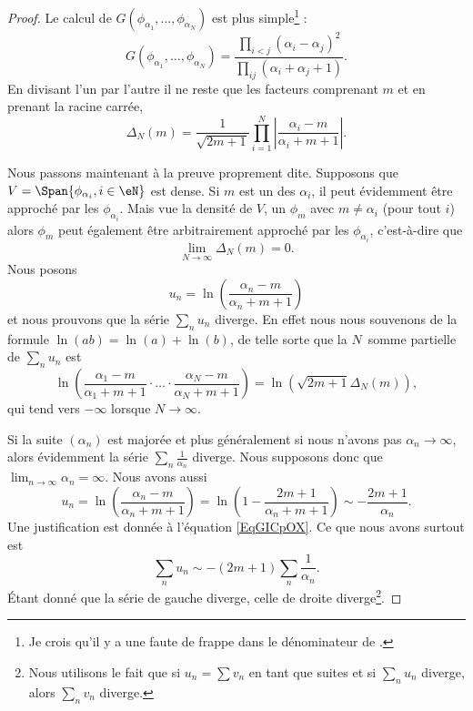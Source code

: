 \begin{proof}
	Le calcul de \( G(\phi_{\alpha_1},\ldots, \phi_{\alpha_N})\) est plus simple\footnote{Je crois qu'il y a une faute de frappe dans le dénominateur de \cite{jqZSyG}.} :
	\begin{equation}
		G(\phi_{\alpha_1},\ldots, \phi_{\alpha_N})=\frac{ \prod_{i<j}(\alpha_i-\alpha_j)^2 }{ \prod_{ij}(\alpha_i+\alpha_j+1) }.
	\end{equation}
	En divisant l'un par l'autre il ne reste que les facteurs comprenant \( m\) et en prenant la racine carrée,
	\begin{equation}    \label{EqANiuNB}
		\Delta_N(m)=\frac{1}{ \sqrt{2m+1} }\prod_{i=1}^N\left| \frac{ \alpha_i-m }{ \alpha_i+m+1 } \right| .
	\end{equation}

	Nous passons maintenant à la preuve proprement dite. Supposons que \( V=\Span\{ \phi_{\alpha_i},i\in \eN \}\) est dense. Si \( m\) est un des \( \alpha_i\), il peut évidemment être approché par les \( \phi_{\alpha_i}\). Mais vue la densité de \( V\), un \( \phi_m\) avec \( m\neq \alpha_i\) (pour tout \( i\)) alors \( \phi_m\) peut également être arbitrairement approché par les \( \phi_{\alpha_i}\), c'est-à-dire que
	\begin{equation}
		\lim_{N\to \infty} \Delta_N(m)=0.
	\end{equation}
	Nous posons
	\begin{equation}
		u_n=\ln\left( \frac{ \alpha_n-m }{ \alpha_n+m+1 } \right)
	\end{equation}
	et nous prouvons que la série \( \sum_nu_n\) diverge. En effet nous nous souvenons de la formule \( \ln(ab)=\ln(a)+\ln(b)\), de telle sorte que la \( N\)\ieme\ somme partielle de \( \sum_nu_n\) est
	\begin{equation}
		\ln\left( \frac{ \alpha_1-m }{ \alpha_1+m+1 }\cdot\ldots\cdot \frac{ \alpha_N-m }{ \alpha_N+m+1 } \right)=\ln\left( \sqrt{2m+1}\Delta_N(m) \right),
	\end{equation}
	qui tend vers \( -\infty\) lorsque \( N\to \infty\).

	Si la suite \( (\alpha_n)\) est majorée et plus généralement si nous n'avons pas \( \alpha_n\to \infty\), alors évidemment la série \( \sum_n\frac{1}{ \alpha_n }\) diverge. Nous supposons donc que \( \lim_{n\to \infty} \alpha_n=\infty\). Nous avons aussi
	\begin{equation}
		u_n=\ln\left( \frac{ \alpha_n-m }{ \alpha_n+m+1 } \right)=\ln\left( 1-\frac{ 2m+1 }{ \alpha_n+m+1 } \right)\sim-\frac{ 2m+1 }{ \alpha_n }.
	\end{equation}
	Une justification est donnée à l'équation \eqref{EqGICpOX}. Ce que nous avons surtout est
	\begin{equation}
		\sum_n u_n\sim -(2m+1)\sum_n\frac{1}{ \alpha_n }.
	\end{equation}
	Étant donné que la série de gauche diverge, celle de droite diverge\footnote{Nous utilisons le fait que si \( u_n=\sum v_n\) en tant que suites et si \( \sum_nu_n\) diverge, alors \( \sum_nv_n\) diverge.}.


\end{proof}
